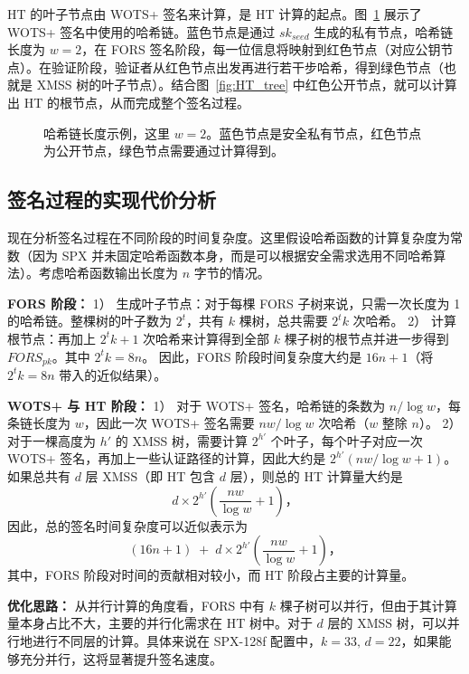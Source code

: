 \documentclass[report]{../../custom}
\begin{document}
HT 的叶子节点由 WOTS+ 签名来计算，是 HT 计算的起点。图~\ref{fig:hashchain} 展示了 WOTS+ 签名中使用的哈希链。蓝色节点是通过 $sk_{seed}$ 生成的私有节点，哈希链长度为 $w=2$，在 FORS 签名阶段，每一位信息将映射到红色节点（对应公钥节点）。在验证阶段，验证者从红色节点出发再进行若干步哈希，得到绿色节点（也就是 XMSS 树的叶子节点）。结合图~\ref{fig:HT_tree} 中红色公开节点，就可以计算出 HT 的根节点，从而完成整个签名过程。

\begin{figure}
  \begin{center}
  \end{center}
  \caption{哈希链长度示例，这里 $w=2$。蓝色节点是安全私有节点，红色节点为公开节点，绿色节点需要通过计算得到。}\label{fig:hashchain}
\end{figure}

\subsection{签名过程的实现代价分析}

现在分析签名过程在不同阶段的时间复杂度。这里假设哈希函数的计算复杂度为常数（因为 SPX 并未固定哈希函数本身，而是可以根据安全需求选用不同哈希算法）。考虑哈希函数输出长度为 $n$ 字节的情况。

\textbf{FORS 阶段：}
1） 生成叶子节点：对于每棵 FORS 子树来说，只需一次长度为 1 的哈希链。整棵树的叶子数为 $2^t$，共有 $k$ 棵树，总共需要 $2^t k$ 次哈希。
2） 计算根节点：再加上 $2^t k + 1$ 次哈希来计算得到全部 $k$ 棵子树的根节点并进一步得到 $FORS_{pk}$。其中 $2^t k = 8n$。
因此，FORS 阶段时间复杂度大约是 $16n + 1$（将 $2^t k = 8n$ 带入的近似结果）。

\textbf{WOTS+ 与 HT 阶段：}
1） 对于 WOTS+ 签名，哈希链的条数为 $n / \log w$，每条链长度为 $w$，因此一次 WOTS+ 签名需要 $n w / \log w$ 次哈希（$w$ 整除 $n$）。
2） 对于一棵高度为 $h'$ 的 XMSS 树，需要计算 $2^{h'}$ 个叶子，每个叶子对应一次 WOTS+ 签名，再加上一些认证路径的计算，因此大约是 $2^{h'} (nw/\log{w} + 1)$。
如果总共有 $d$ 层 XMSS（即 HT 包含 $d$ 层），则总的 HT 计算量大约是
\[
  d \times 2^{h'} \left(\frac{n w}{\log w} + 1\right)，
\]
因此，总的签名时间复杂度可以近似表示为
\[
  (16n + 1) \;+\; d \times 2^{h'} \left(\frac{n w}{\log w} + 1\right)，
\]
其中，FORS 阶段对时间的贡献相对较小，而 HT 阶段占主要的计算量。

\textbf{优化思路：}
从并行计算的角度看，FORS 中有 $k$ 棵子树可以并行，但由于其计算量本身占比不大，主要的并行化需求在 HT 树中。对于 $d$ 层的 XMSS 树，可以并行地进行不同层的计算。具体来说在 SPX-128f 配置中，$k = 33,\, d = 22$，如果能够充分并行，这将显著提升签名速度。
\end{document}
